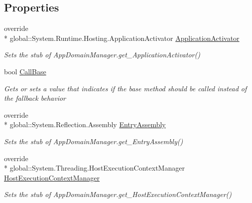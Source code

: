 \subsection*{Properties}
\begin{DoxyCompactItemize}
\item 
override \\*
global\-::\-System.\-Runtime.\-Hosting.\-Application\-Activator \hyperlink{class_system_1_1_fakes_1_1_stub_app_domain_manager_ac129372fa6597ea6e659b735ad230615}{Application\-Activator}
\begin{DoxyCompactList}\small\item\em Sets the stub of App\-Domain\-Manager.\-get\-\_\-\-Application\-Activator()\end{DoxyCompactList}\item 
bool \hyperlink{class_system_1_1_fakes_1_1_stub_app_domain_manager_a51da02ce59cb8f7b2db16f0684c63713}{Call\-Base}
\begin{DoxyCompactList}\small\item\em Gets or sets a value that indicates if the base method should be called instead of the fallback behavior\end{DoxyCompactList}\item 
override \\*
global\-::\-System.\-Reflection.\-Assembly \hyperlink{class_system_1_1_fakes_1_1_stub_app_domain_manager_ac5be91cb41102c75b5862b1f4c2eee41}{Entry\-Assembly}
\begin{DoxyCompactList}\small\item\em Sets the stub of App\-Domain\-Manager.\-get\-\_\-\-Entry\-Assembly()\end{DoxyCompactList}\item 
override \\*
global\-::\-System.\-Threading.\-Host\-Execution\-Context\-Manager \hyperlink{class_system_1_1_fakes_1_1_stub_app_domain_manager_a982a24ef492311a1902081d30537bfc9}{Host\-Execution\-Context\-Manager}
\begin{DoxyCompactList}\small\item\em Sets the stub of App\-Domain\-Manager.\-get\-\_\-\-Host\-Execution\-Context\-Manager()\end{DoxyCompactList}\item 

\end{DoxyCompactItemize}
